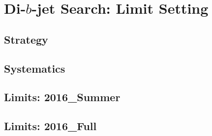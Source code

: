 \chapter{Di-$b$-jet Search: Limit Setting}
\label{sec:lim}

\section{Strategy}
\label{sec:lim-strat}

\section{Systematics}
\label{sec:lim-syst}

\section{Limits: 2016\_Summer}
\label{sec:lim-summer}

\section{Limits: 2016\_Full}
\label{sec:lim-full}
